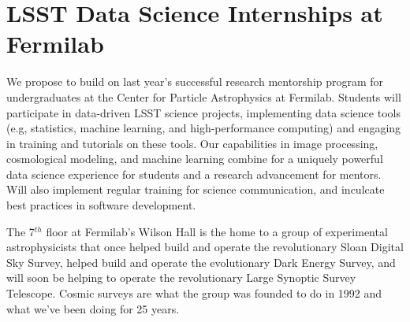 
\section{LSST Data Science Internships at Fermilab}


 
We propose to build on last year's successful research mentorship program for undergraduates at the Center for Particle Astrophysics at Fermilab.
Students will participate in data-driven LSST science projects, implementing data science tools (e.g, statistics, machine learning, and high-performance computing) and engaging in training and tutorials on these tools.
Our capabilities in image processing, cosmological modeling, and machine learning combine for a uniquely powerful
data science experience for students and a research advancement for mentors.
Will also implement regular training for science communication, and inculcate best practices in software development.


The 7$^{th}$ floor at Fermilab's Wilson Hall is the home to a 
group of experimental astrophysicists that once helped build and operate
the revolutionary Sloan Digital Sky Survey, helped build and operate
the evolutionary Dark Energy Survey, and will soon be helping to operate 
the revolutionary Large Synoptic Survey Telescope. Cosmic surveys are
what the group was founded to do in 1992 and what we've been doing for 25 years.



